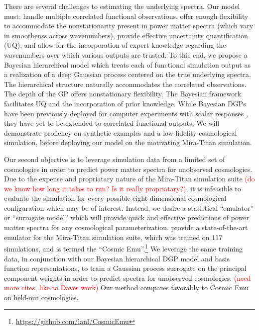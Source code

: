 \documentclass[11pt]{article}
\begin{document}
There are several challenges to estimating the underlying spectra.  Our model
must: handle multiple correlated functional observations, offer enough 
flexibility to accommodate the nonstationarity present in power matter spectra 
(which vary in smoothenss across wavenumbers), provide effective uncertainty
quantification (UQ), and allow for the incorporation of expert knowledge 
regarding the wavenumbers over which various outputs are trusted.  To this end, 
we propose a Bayesian hierarchical model which treats each of functional simulation 
output as a realization of a deep Gaussian process \citep[DGP;][]{damianou2013deep} 
centered on the true underlying spectra.  The hierarchical structure naturally
accommodates the correlated observations.  The depth of the GP offers nonstationary
flexibility.  The Bayesian framework facilitates UQ and the incorporation of prior
knowledge.  While Bayesian DGPs have been previously deployed for computer experiments 
with scalar responses \citep[e.g.,][]{sauer2023active,sauer2023vecchia,ming2023deep}, 
they have yet to be extended to correlated functional outputs. 
We will demonstrate profiency on synthetic examples and a low fidelity
cosmological simulation, before deploying our model on the motivating 
Mira-Titan simulation.

Our second objective is to leverage simulation data from a limited set of
cosmologies in order to predict power matter spectra for unobserved cosmologies.
Due to the expense and propriatary nature of the Mira-Titan simulation suite
\textcolor{red}{(do we know how long it takes to run?  Is it really propriatary?)},
it is infeasible to evaluate the simulation for every possible eight-dimensional
cosmological configuration which may be of interest.  Instead, we desire
a statistical ``emulator'' or ``surrogate model'' 
\citep{santner2003design,gramacy2020surrogates} which will provide quick and effective
predictions of power matter spectra for any cosmological parameterization.
\citet{moran2023mira} provide a state-of-the-art emulator for the Mira-Titan
simulation suite, which was trained on 117 simulations, and is termed 
the ``Cosmic Emu''.\footnote{\url{https://github.com/lanl/CosmicEmu}}
We leverage the same training data, in conjunction with our Bayesian hierarchical
DGP model and basis function representations, to train a Gaussian process surrogate 
on the principal component weights in order to predict spectra for unobserved
cosmologies.  \textcolor{red}{(need more cites, like to Daves work)}
Our method compares favorably to Cosmic Emu on held-out cosmologies.
\end{document}
